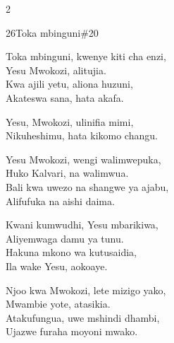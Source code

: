 \documentclass{article}
\begin{document}
\begin{multicols}{2}
\begin{hymn}{26}{Toka mbinguni}{\#20}
\begin{stanza}
Toka mbinguni, kwenye kiti cha enzi,\\
Yesu Mwokozi, alitujia.\\
Kwa ajili yetu, aliona huzuni,\\
Akateswa sana, hata akafa.
\end{stanza}
\begin{chorus}
Yesu, Mwokozi, ulinifia mimi,\\
Nikuheshimu, hata kikomo changu.
\end{chorus}
\begin{stanza}
Yesu Mwokozi, wengi walimwepuka,\\
Huko Kalvari, na walimwua.\\
Bali kwa uwezo na shangwe ya ajabu,\\
Alifufuka na aishi daima.
\end{stanza}
\begin{stanza}
Kwani kumwudhi, Yesu mbarikiwa,\\
Aliyemwaga damu ya tunu.\\
Hakuna mkono wa kutusaidia,\\
Ila wake Yesu, aokoaye.
\end{stanza}
\begin{stanza}
Njoo kwa Mwokozi, lete mizigo yako,\\
Mwambie yote, atasikia.\\
Atakufungua, uwe mshindi dhambi,\\
Ujazwe furaha moyoni mwako.
\end{stanza}
\end{hymn}


\end{multicols}
\end{document}
